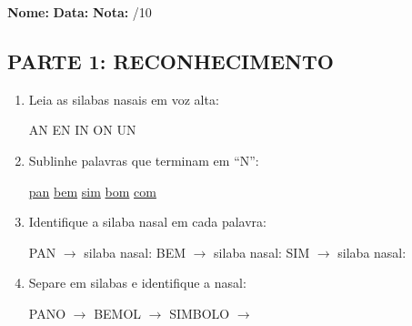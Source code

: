 \begin{exercicio}
\noindent\textbf{Nome:} \underline{\hspace{3.2cm}} \quad \textbf{Data:} \underline{\hspace{1.6cm}} \quad \textbf{Nota:} \underline{\hspace{0.9cm}}/10

\subsection*{PARTE 1: RECONHECIMENTO}

\begin{enumerate}
  \item Leia as silabas nasais em voz alta:
  \begin{center}
  AN \quad EN \quad IN \quad ON \quad UN
  \end{center}

  \item Sublinhe palavras que terminam em ``N'':
  \begin{center}
  \uline{pan} \quad \uline{bem} \quad \uline{sim} \quad \uline{bom} \quad \uline{com}
  \end{center}

  \item Identifique a silaba nasal em cada palavra:
  \begin{center}
  PAN $\rightarrow$ silaba nasal: \underline{\hspace{1cm}} \quad BEM $\rightarrow$ silaba nasal: \underline{\hspace{1cm}} \quad SIM $\rightarrow$ silaba nasal: \underline{\hspace{1cm}}
  \end{center}

  \item Separe em silabas e identifique a nasal:
  \begin{center}
  PANO $\rightarrow$ \underline{\hspace{1cm}} \underline{\hspace{1cm}} \quad BEMOL $\rightarrow$ \underline{\hspace{1cm}} \underline{\hspace{1cm}} \quad SIMBOLO $\rightarrow$ \underline{\hspace{1cm}} \underline{\hspace{1cm}} \underline{\hspace{1cm}}
  \end{center}


\end{enumerate}
\end{exercicio}
